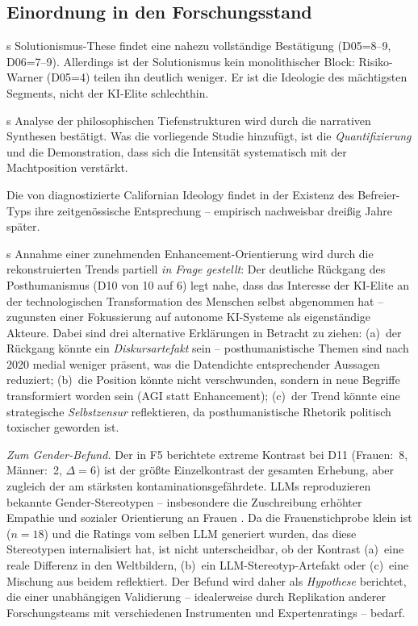 \documentclass[12pt,a4paper]{article}
\begin{document}
\subsection{Einordnung in den Forschungsstand}
\label{sec:diskussion:einordnung}

\citeauthor{Morozov2013}s Solutionismus-These findet eine nahezu vollst\"andige Best\"atigung (D05=8--9, D06=7--9). Allerdings ist der Solutionismus kein monolithischer Block: Risiko-Warner (D05=4) teilen ihn deutlich weniger. Er ist die Ideologie des m\"achtigsten Segments, nicht der KI-Elite schlechthin.

\citeauthor{Daub2020}s Analyse der philosophischen Tiefenstrukturen wird durch die narrativen Synthesen best\"atigt. Was die vorliegende Studie hinzuf\"ugt, ist die \emph{Quantifizierung} und die Demonstration, dass sich die Intensit\"at systematisch mit der Machtposition verst\"arkt.

Die von \citet{BarbCam1996} diagnostizierte Californian Ideology findet in der Existenz des Befreier-Typs ihre zeitgen\"ossische Entsprechung -- empirisch nachweisbar drei\ss{}ig Jahre sp\"ater.

\citeauthor{Coeckelbergh2020}s Annahme einer zunehmenden Enhancement-Orientierung wird durch die rekonstruierten Trends partiell \emph{in Frage gestellt}: Der deutliche R\"uckgang des Posthumanismus (D10 von 10 auf 6) legt nahe, dass das Interesse der KI-Elite an der technologischen Transformation des Menschen selbst abgenommen hat -- zugunsten einer Fokussierung auf autonome KI-Systeme als eigenst\"andige Akteure. Dabei sind drei alternative Erkl\"arungen in Betracht zu ziehen: (a)~der R\"uckgang k\"onnte ein \emph{Diskursartefakt} sein -- posthumanistische Themen sind nach 2020 medial weniger pr\"asent, was die Datendichte entsprechender Aussagen reduziert; (b)~die Position k\"onnte nicht verschwunden, sondern in neue Begriffe transformiert worden sein (\glqq AGI\grqq{} statt \glqq Enhancement\grqq); (c)~der Trend k\"onnte eine strategische \emph{Selbstzensur} reflektieren, da posthumanistische Rhetorik politisch toxischer geworden ist.

\emph{Zum Gender-Befund.} Der in F5 berichtete extreme Kontrast bei D11 (Frauen:~8, M\"anner:~2, $\Delta = 6$) ist der gr\"o\ss{}te Einzelkontrast der gesamten Erhebung, aber zugleich der am st\"arksten kontaminationsgef\"ahrdete. LLMs reproduzieren bekannte Gender-Stereotypen -- insbesondere die Zuschreibung erh\"ohter Empathie und sozialer Orientierung an Frauen \citep{Santurkar2023}. Da die Frauenstichprobe klein ist ($n = 18$) und die Ratings vom selben LLM generiert wurden, das diese Stereotypen internalisiert hat, ist nicht unterscheidbar, ob der Kontrast (a)~eine reale Differenz in den Weltbildern, (b)~ein LLM-Stereotyp-Artefakt oder (c)~eine Mischung aus beidem reflektiert. Der Befund wird daher als \emph{Hypothese} berichtet, die einer unabh\"angigen Validierung -- idealerweise durch Replikation anderer Forschungsteams mit verschiedenen Instrumenten und Expertenratings -- bedarf.
\end{document}
